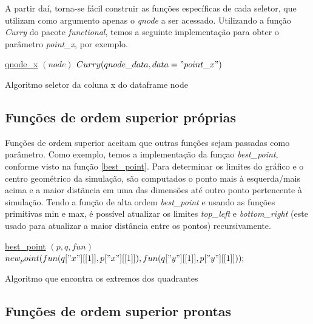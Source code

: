 \documentclass[rel_mlp]{iiufrgs}
\begin{document}
    A partir daí, torna-se fácil construir as funções específicas de cada seletor, que utilizam como argumento apenas o \textit{qnode} a ser acessado. Utilizando a função \textit{Curry} do pacote \textit{functional}, temos a seguinte implementação para obter o parâmetro \textit{point{\_}x}, por exemplo.

    \begin{algorithm}
	\label{qnode_x}
    \underline{qnode{\_}x} $(node)$\;
	$Curry(qnode{\_}data, data="point{\_}x") $\;
	\caption{Algoritmo seletor da coluna x do dataframe node}
	\end{algorithm}

	\subsection{Funções de ordem superior próprias}

    Funções de ordem superior aceitam que outras funções sejam passadas como parâmetro. Como exemplo, temos a implementação da funçao
        \textit{best{\_}point}, conforme visto na função \ref{best_point}. Para determinar os limites do gráfico e o centro geométrico da simulação,
         são computados o ponto mais à esquerda/mais acima e a maior distãncia em uma das dimensões até outro ponto pertencente à simulação. Tendo a função de alta ordem \textit{best{\_}point} e usando as funções primitivas min e max, é possível atualizar os limites \textit{top{\_}left} e \textit{bottom{\_}right} (este usado para atualizar a maior distância entre os pontos) recursivamente.

    \begin{algorithm}
    \label{best_point}
    \underline{best{\_}point} $(p, q, fun)$\;
    $ new_point(fun(q["x"][[1]], p["x"][[1]]), fun(q["y"][[1]], p["y"][[1]])); $\;
    \caption{Algoritmo que encontra os extremos dos quadrantes}
    \end{algorithm}

    \subsection{Funções de ordem superior prontas}
\end{document}
